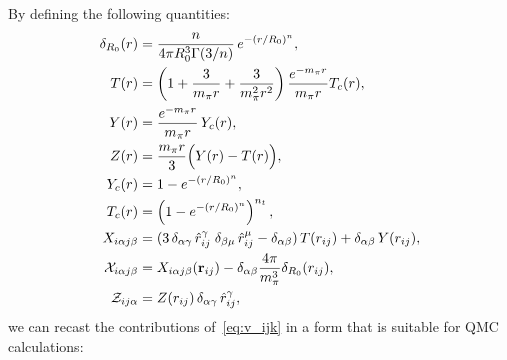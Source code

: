 \documentclass[aps,prc,twocolumn,superscriptaddress,floatfix]{revtex4-1}
\begin{document}
By defining the following quantities:
\begin{align}
\delta_{R_0}(r)&=\frac{n}{4\pi R_0^3\Gamma(3/n)}\,e^{-(r/R_0)^n}
\nonumber, \\
T(r)&=\left(1+\frac{3}{m_\pi r}+\frac{3}{m_\pi^2r^2}\right)\frac{e^{-m_\pi r}}{m_\pi r} T_c(r)
\nonumber, \\
Y(r)&=\frac{e^{-m_\pi r}}{m_\pi r}\,Y_c(r) 
\nonumber, \\
Z(r)&=\frac{m_\pi r}{3}\Big(Y(r)-T(r)\Big)
\nonumber, \\
Y_c(r)&=1-e^{-(r/R_0)^n}
\nonumber, \\
T_c(r)&=\left(1-e^{-(r/R_0)^n}\right)^{n_t}
\nonumber, \\
X_{i\alpha j\beta}&=(3\,\delta_{\alpha\gamma}\,\hat{r}_{ij}^\gamma\;\delta_{\beta\mu}\,\hat{r}_{ij}^\mu-\delta_{\alpha\beta})\,T(r_{ij})
+\delta_{\alpha\beta}\,Y(r_{ij}) 
\nonumber, \\
{\cal X}_{i\alpha j\beta}&=X_{i\alpha j\beta}(\vb{r}_{ij})-\delta_{\alpha\beta}\frac{4\pi}{m_\pi^3}\delta_{R_0}(r_{ij})
\nonumber, \\
{\cal Z}_{ij\alpha}&=Z(r_{ij})\,\delta_{\alpha\gamma}\,\hat{r}_{ij}^\gamma,
\end{align}
we can recast the contributions of~\cref{eq:v_ijk} in a form that is suitable for QMC calculations:
\end{document}
